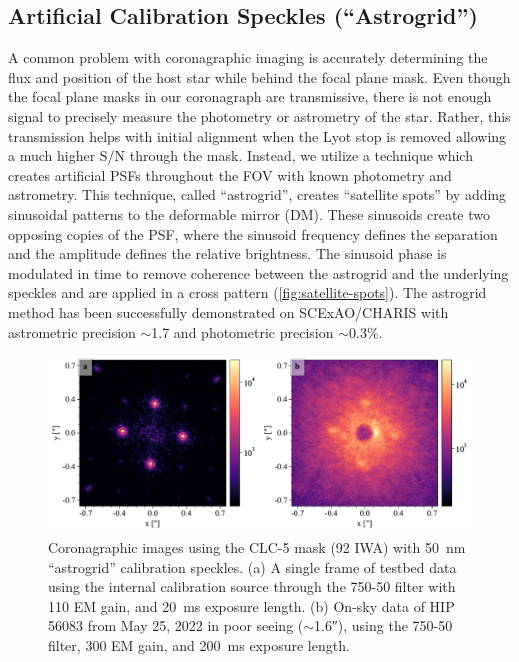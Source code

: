 \documentclass[]{spie}  %
\begin{document}
\subsection{Artificial Calibration Speckles (``Astrogrid'')}

A common problem with coronagraphic imaging is accurately determining the flux and position of the host star while behind the focal plane mask. Even though the focal plane masks in our coronagraph are transmissive, there is not enough signal to precisely measure the photometry or astrometry of the star. Rather, this transmission helps with initial alignment when the Lyot stop is removed allowing a much higher S/N through the mask. Instead, we utilize a technique which creates artificial PSFs throughout the FOV with known photometry and astrometry. This technique, called ``astrogrid''\cite{sahoo2020}, creates ``satellite spots'' by adding sinusoidal patterns to the deformable mirror (DM). These sinusoids create two opposing copies of the PSF, where the sinusoid frequency defines the separation and the amplitude defines the relative brightness. The sinusoid phase is modulated in time to remove coherence between the astrogrid and the underlying speckles and are applied in a cross pattern (\autoref{fig:satellite-spots}). The astrogrid method has been successfully demonstrated on SCExAO/CHARIS with astrometric precision $\sim$\qty{1.7}{\milliarcsecond} and photometric precision $\sim$0.3\%\cite{currie2020}.

\begin{figure}
   \centering
   \includegraphics[width=\textwidth]{figures/astrogrid_psf}
   \caption{Coronagraphic images using the CLC-5 mask (\qty{92}{\milliarcsecond} IWA) with \qty{50}{\nano\meter} ``astrogrid'' calibration speckles. (a) A single frame of testbed data using the internal calibration source through the 750-50 filter with 110 EM gain, and \qty{20}{\milli\second} exposure length. (b) On-sky data of HIP 56083 from May 25, 2022 in poor seeing ($\sim$\ang{;;1.6}), using the 750-50 filter, 300 EM gain, and \qty{200}{\milli\second} exposure length.}\label{fig:satellite-spots}
\end{figure}
\end{document}
